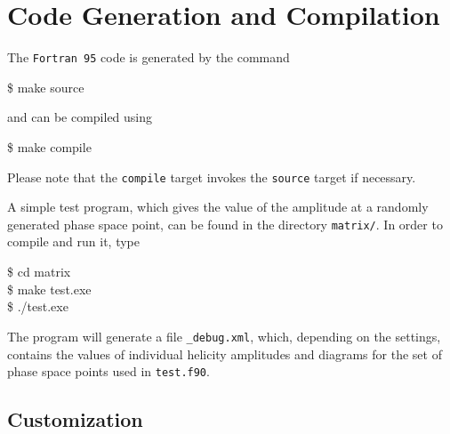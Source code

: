 \documentclass[11pt,a4paper]{refrep}
\newcommand{\fortranXC}{{\tt Fortran\,95}\xspace}
\begin{document}
\section{Code Generation and Compilation}
The \fortranXC code is generated by the command
\begin{example}
\$ make source
\end{example}
and can be compiled using
\begin{example}
\$ make compile
\end{example}
Please note that the \texttt{compile} target invokes
the \texttt{source} target if necessary.

A simple test program,
which gives the value of the amplitude at a randomly generated phase space point,
can be found in the directory \texttt{matrix/}.
In order to compile and run it, type
\begin{example}
\$ cd matrix\\
\$ make test.exe\\
\$ ./test.exe
\end{example}
The program will generate a file \texttt{\_debug.xml},
which, depending on the settings, contains the values of individual  helicity amplitudes
and diagrams for the set of phase space points used in {\tt test.f90}.

\subsection{Customization}
\end{document}
